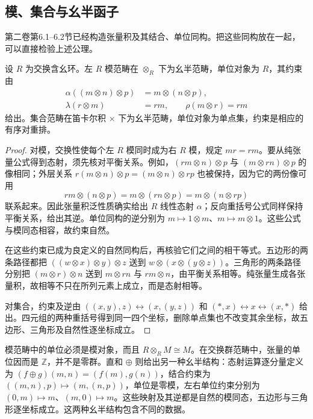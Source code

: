\subsection{模、集合与幺半函子}
\label{b4:subsec:monoidal-examples-functors}

第二卷第6.1--6.2节已经构造张量积及其结合、单位同构。把这些同构放在一起，可以直接检验上述公理。

\begin{proposition}\label{b4:prop:monoidal-modules-sets}
	设 \(R\) 为交换含幺环。左 \(R\) 模范畴在 \(\otimes_R\) 下为幺半范畴，单位对象为 \(R\)，其约束由
	\[
		\begin{aligned}
			\alpha((m\otimes n)\otimes p)&=m\otimes(n\otimes p),\\
			\lambda(r\otimes m)&=rm,\qquad \rho(m\otimes r)=rm
		\end{aligned}
	\]
	给出。集合范畴在笛卡尔积 \(\times\) 下为幺半范畴，单位对象为单点集，约束是相应的有序对重排。
\end{proposition}
\begin{proof}
	对模，交换性使每个左 \(R\) 模同时成为右 \(R\) 模，规定 \(mr=rm\)。要从纯张量公式得到态射，须先核对平衡关系。例如，\((rm\otimes n)\otimes p\) 与 \((m\otimes rn)\otimes p\) 的像相同；外层关系 \(r(m\otimes n)\otimes p=(m\otimes n)\otimes rp\) 也被保持，因为它的两份像可用
	\[
		rm\otimes(n\otimes p)=m\otimes(rn\otimes p)=m\otimes(n\otimes rp)
	\]
	联系起来。因此张量积泛性质确实给出 \(R\) 线性态射 \(\alpha\)；反向重括号公式同样保持平衡关系，给出其逆。单位同构的逆分别为 \(m\mapsto1\otimes m\)、\(m\mapsto m\otimes1\)。这些公式与模同态相容，故约束自然。

	在这些约束已成为良定义的自然同构后，再核验它们之间的相干等式。五边形的两条路径都把 \(((w\otimes x)\otimes y)\otimes z\) 送到 \(w\otimes(x\otimes(y\otimes z))\)。三角形的两条路径分别把 \((m\otimes r)\otimes n\) 送到 \(m\otimes rn\) 与 \(rm\otimes n\)，由平衡关系相等。纯张量生成各张量积，故相等不只在所列元素上成立，而是态射相等。

	对集合，约束及逆由 \(((x,y),z)\leftrightarrow(x,(y,z))\) 和 \((*,x)\leftrightarrow x\leftrightarrow(x,*)\) 给出。四元组的两种重括号得到同一四个坐标，删除单点集也不改变其余坐标，故五边形、三角形及自然性逐坐标成立。
\end{proof}

模范畴中的单位必须是模对象，而且 \(R\otimes_RM\cong M\)。在交换群范畴中，张量的单位因而是 \(\mathbb Z\)，并不是零群。直和 \(\oplus\) 则给出另一种幺半结构：态射运算逐分量定义为 \((f\oplus g)(m,n)=(f(m),g(n))\)，结合约束为 \(((m,n),p)\mapsto(m,(n,p))\)，单位是零模，左右单位约束分别为 \((0,m)\mapsto m\)、\((m,0)\mapsto m\)。这些映射及其逆都是自然的模同态，五边形与三角形逐坐标成立。这两种幺半结构包含不同的数据。

